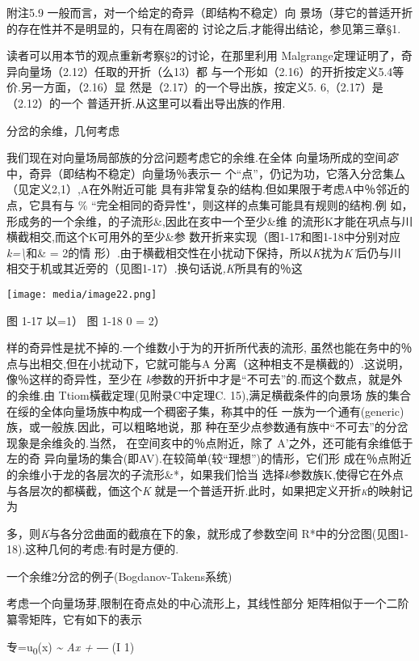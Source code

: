 \documentclass{article}
\begin{document}
附注5.9 一般而言，对一个给定的奇异（即结构不稳定）向
景场（芽它的普适开折的存在性并不是明显的，只有在周密的
讨论之后,才能得出结论，参见第三章§1.

读者可以用本节的观点重新考察§2的讨论，在那里利用
Malgrange定理证明了，奇异向量场（2.12）任取的开折（么13）都
与一个形如（2.16）的开折按定义5.4等价.另一方面，（2.16）显
然是（2.17）的一个导出族，按定义5. 6,（2.17）是（2.12）的一个
普适开折.从这里可以看出导出族的作用.

分岔的余维，几何考虑

我们现在对向量场局部族的分岔问题考虑它的余维.在全体
向量场所成的空间\emph{宓}中，奇异（即结构不稳定）向量场％表示一
个``点''，仍记为功，它落入分岔集厶（见定义2,1）,A在外附近可能
具有非常复杂的结构.但如果限于考虑A中％邻近的点，它具有与 \%
``完全相同的奇异性"，则这样的点集可能具有规则的结枸.例
如，形成务的一个余维，的子流形\&,因此在亥中一个至少\&维
的流形K才能在巩点与川横截相交,而这个K可用外的至少\&参
数开折来实现（图1-17和图1-18中分别对应\emph{k=\textbackslash{}}和\& =
2的情
形）.由于横截相交性在小扰动下保持，所以\emph{K}扰为\emph{K'}后仍与川
相交于机或其近旁的（见图1-17）.换句话说\emph{,K}所具有的％这

\texttt{[image: media/image22.png]}

图 1-17 以=1） 图 1-18 0 = 2）

样的奇异性是扰不掉的.一个维数小于为的开折所代表的流形,
虽然也能在务中的％点与出相交,但在小扰动下，它就可能与A
分离（这种相支不是横截的）.这说明，像％这样的奇异性，至少在
\emph{k}参数的开折中才是``不可去''的.而这个数点，就是外的余维.由
Ttiom橫截定理(见附录C中定理C. 15),满足横截条件的向景场
族的集合在绥的全体向量场族中构成一个稠密子集，称其中的任
一族为一个通有(generic)族，或一般族.因此，可以粗略地说，那
种在至少点参数通有族中``不可去''的分岔现象是余维灸的.当然，
在空间亥中的％点附近，除了 A'之外，还可能有余维低于左的奇
异向量场的集合(即AV).在较简单(较``理想'')的情形，它们形
成在％点附近的余维小于龙的各层次的子流形\&*，如果我们恰当
选择\emph{k}参数族K,使得它在外点与各层次的都橫截，価这个\emph{K}
就是一个普适开折.此时，如果把定义开折\emph{\textsc{k}}的映射记为

多，则\emph{K}与各分岔曲面的截痕在下的象，就形成了参数空间
R*中的分岔图(见图1-18).这种几何的考虑:有时是方便的.

一个余维2分岔的例子(Bogdanov-Takens系统)

考虑一个向量场芽,限制在奇点处的中心流形上，其线性部分
矩阵相似于一个二阶纂零矩阵，它有如下的表示

专=u\textsubscript{0}(x) \emph{\textasciitilde{} Ax + ―} (I 1)
\end{document}
